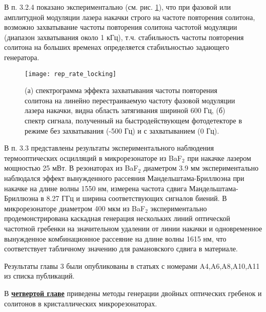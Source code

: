 В п. 3.2.4 показано экспериментально (см. рис. \ref{rep_rate_locking}), что при фазовой или амплитудной модуляции лазера накачки строго на частоте повторения солитона, возможно захватывание частоты повторения солитона частотой модуляции (диапазон захватывания около 1 кГц), т.ч. стабильность частоты повторения солитона на больших временах определяется стабильностью задающего генератора.

\begin{figure}[!htb]
  \centering
  \texttt{[image: rep\_rate\_locking]}
  \setlength{\belowcaptionskip}{1pt}
  \caption{(а) спектрограмма эффекта захватывания частоты повторения солитона на линейно перестраиваемую частоту фазовой модуляции лазера накачки, видна область затягивания шириной 600 Гц, (б) спектр сигнала, полученный на быстродействующем фотодетекторе в режиме без захватывания (-500 Гц) и с захватыванием (0 Гц).}
  \label{rep_rate_locking}
\end{figure}

В п. 3.3 представлены результаты экспериментального наблюдения термооптических осцилляций в микрорезонаторе из BaF$_2$ при накачке лазером мощностью 25 мВт. В резонаторах из BaF$_2$ диаметром 3.9 мм экспериментально наблюдался эффект вынужденного рассеяния Мандельштама-Бриллюэна при накачке на длине волны 1550 нм, измерена частота сдвига Мандельштама-Бриллюэна в 8.27 ГГц и ширина соответствующих сигналов биений. В микрорезонаторе диаметром 400 мкм из BaF$_2$ экспериментально продемонстрирована каскадная генерация нескольких линий оптической частотной гребенки на значительном удалении от линии накачки и одновременное вынужденное комбинационное рассеяние на длине волны 1615 нм, что соответствует табличному значению для рамановского сдвига в материале.

Результаты главы 3 были опубликованы в статьях с номерами A4,A6,A8,A10,A11 из списка публикаций.

В \underline{\textbf{четвертой главе}} приведены методы генерации двойных оптических гребенок и солитонов в кристаллических микрорезонаторах.

